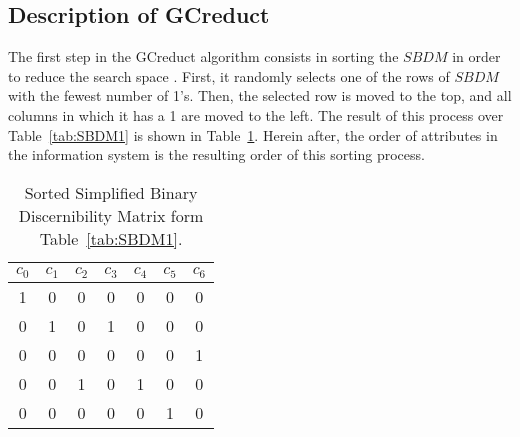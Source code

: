 \documentclass[authoryear,preprint,review,12pt]{elsarticle}
\begin{document}
\subsection{Description of GCreduct}\label{description}

	The first step in the GCreduct algorithm consists in sorting the $SBDM$ in order to reduce the search space
	\citep{Sanchez07}. First, it randomly selects one of the rows of $SBDM$ with the fewest number of 1's. Then, 
	the selected row is moved to the top, and all columns in which it has a 1 are moved to the left. 
	The result of this process over Table~\ref{tab:SBDM1} is shown in Table~\ref{tab:SSBDM1}. Herein after, the order of attributes in the information system is the resulting order of this sorting process.
		
	\begin{table}[htb]
		\caption{Sorted Simplified Binary Discernibility Matrix form Table~\ref{tab:SBDM1}.}
		\centering
		\begin{tabular}{ccccccc}\label{tab:SSBDM1}
			$c_0$ & $c_1$ & $c_2$ & $c_3$ & $c_4$ & $c_5$ & $c_6$\\
			\hline
			1&0&0&0&0&0&0\\
			0&1&0&1&0&0&0\\
			0&0&0&0&0&0&1\\
			0&0&1&0&1&0&0\\
			0&0&0&0&0&1&0\\
		\end{tabular}             
	\end{table}  
	
\end{document}
